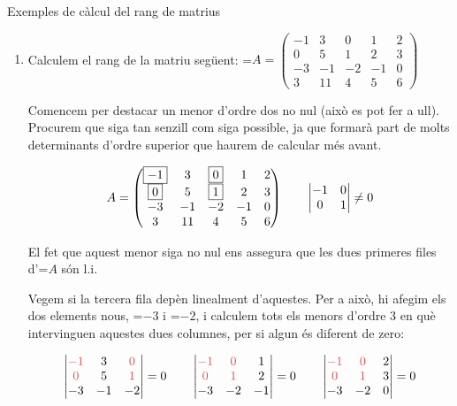 \documentclass[11pt,a4paper]{article}
\newcommand{\fmm}[1]{\setbox0=\hbox{$#1$}\ifdim\wd0>\linewidth\fmdisp{#1}\else\mbox{\box0}\fi}
\newcommand{\fmdisp}[1]{\[\setbox2=\hbox{$\displaystyle #1$}\ifdim\wd2>\linewidth\resizebox{\linewidth}{!}{\box2}\else\box2\fi\]}
\begin{document}
\begin{fmex}{Exemples de càlcul del rang de matrius}
\begin{enumerate}[label=\textbf{\arabic*.},leftmargin=*]
\item Calculem el rang de la matriu següent: \fmm{A=\begin{pmatrix}-1 & 3 & 0 & 1 & 2\\ 0 & 5 & 1 & 2 & 3\\ -3 & -1 & -2 & -1 & 0\\ 3 & 11 & 4 & 5 & 6\end{pmatrix}}

Comencem per destacar un menor d'ordre dos no nul (això es pot fer a ull). Procurem que siga tan senzill com siga possible, ja que formarà part de molts determinants d'ordre superior que haurem de calcular més avant.

\fmdisp{A=\begin{pmatrix}\boxed{-1} & 3 & \boxed{0} & 1 & 2\\ \boxed{0} & 5 & \boxed{1} & 2 & 3\\ -3 & -1 & -2 & -1 & 0\\ 3 & 11 & 4 & 5 & 6\end{pmatrix}\qquad\begin{vmatrix}-1 & 0\\ 0 & 1\end{vmatrix}\neq0}

El fet que aquest menor siga no nul ens assegura que les dues primeres files d'\fmm{A} són l.i.

Vegem si la tercera fila depèn linealment d'aquestes. Per a això, hi afegim els dos elements nous, \fmm{-3} i \fmm{-2}, i calculem tots els menors d'ordre 3 en què intervinguen aquestes dues columnes, per si algun és diferent de zero:

\fmdisp{\begin{vmatrix}\color[HTML]{e5484d}-1 & 3 & \color[HTML]{e5484d}0\\ \color[HTML]{e5484d}0 & 5 & \color[HTML]{e5484d}1\\ -3 & -1 & -2\end{vmatrix}=0\qquad\begin{vmatrix}\color[HTML]{e5484d}-1 & \color[HTML]{e5484d}0 & 1\\ \color[HTML]{e5484d}0 & \color[HTML]{e5484d}1 & 2\\ -3 & -2 & -1\end{vmatrix}=0\qquad\begin{vmatrix}\color[HTML]{e5484d}-1 & \color[HTML]{e5484d}0 & 2\\ \color[HTML]{e5484d}0 & \color[HTML]{e5484d}1 & 3\\ -3 & -2 & 0\end{vmatrix}=0}


\end{enumerate}
\end{fmex}
\end{document}
